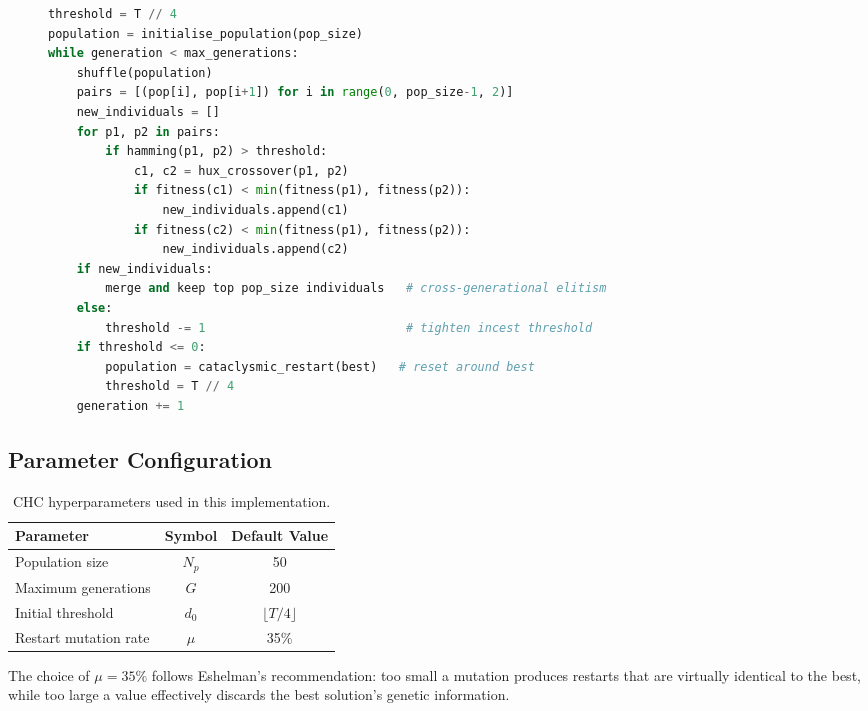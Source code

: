 \documentclass[12pt, a4paper]{article}
\begin{document}
\begin{figure}[H]
\centering
\begin{minipage}{0.92\textwidth}
\begin{lstlisting}[language=Python, caption={CHC main loop (simplified)}, label={alg:chc}]
threshold = T // 4
population = initialise_population(pop_size)
while generation < max_generations:
    shuffle(population)
    pairs = [(pop[i], pop[i+1]) for i in range(0, pop_size-1, 2)]
    new_individuals = []
    for p1, p2 in pairs:
        if hamming(p1, p2) > threshold:
            c1, c2 = hux_crossover(p1, p2)
            if fitness(c1) < min(fitness(p1), fitness(p2)):
                new_individuals.append(c1)
            if fitness(c2) < min(fitness(p1), fitness(p2)):
                new_individuals.append(c2)
    if new_individuals:
        merge and keep top pop_size individuals   # cross-generational elitism
    else:
        threshold -= 1                            # tighten incest threshold
    if threshold <= 0:
        population = cataclysmic_restart(best)   # reset around best
        threshold = T // 4
    generation += 1
\end{lstlisting}
\end{minipage}
\end{figure}

\subsection{Parameter Configuration}

\renewcommand{\arraystretch}{1.3}
\begin{table}[H]
  \centering
  \caption{CHC hyperparameters used in this implementation.}
  \label{tab:params}
  \begin{tabular}{lcc}
    \toprule
    \textbf{Parameter} & \textbf{Symbol} & \textbf{Default Value} \\
    \midrule
    Population size        & $N_p$  & 50 \\
    Maximum generations    & $G$    & 200 \\
    Initial threshold      & $d_0$  & $\lfloor T/4 \rfloor$ \\
    Restart mutation rate  & $\mu$  & 35\% \\
    \bottomrule
  \end{tabular}
\end{table}
\renewcommand{\arraystretch}{1}

The choice of $\mu = 35\%$ follows Eshelman's recommendation: too small a mutation
produces restarts that are virtually identical to the best, while too large a value
effectively discards the best solution's genetic information.
\end{document}
